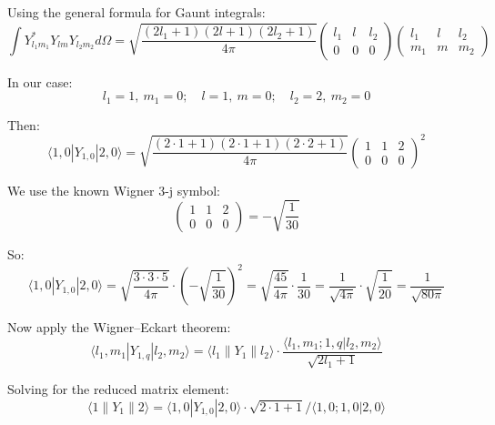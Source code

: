 \documentclass[12pt]{article}
\begin{document}
        Using the general formula for Gaunt integrals:
        \[
            \int Y_{l_1 m_1}^* Y_{l m} Y_{l_2 m_2} d\Omega = 
            \sqrt{\frac{(2l_1+1)(2l+1)(2l_2+1)}{4\pi}} 
            \begin{pmatrix}
                l_1 & l & l_2 \\
                0 & 0 & 0
            \end{pmatrix}
            \begin{pmatrix}
                l_1 & l & l_2 \\
                m_1 & m & m_2
            \end{pmatrix}
        \]
        
        In our case:
        \[
            l_1 = 1,\ m_1 = 0;\quad l = 1,\ m = 0;\quad l_2 = 2,\ m_2 = 0
        \]
        
        Then:
        \[
            \langle 1, 0 | Y_{1, 0} | 2, 0 \rangle = 
            \sqrt{\frac{(2 \cdot 1 + 1)(2 \cdot 1 + 1)(2 \cdot 2 + 1)}{4\pi}} 
            \begin{pmatrix}
                1 & 1 & 2 \\
                0 & 0 & 0
            \end{pmatrix}^2
        \]
        
        We use the known Wigner 3-j symbol:
        \[
            \begin{pmatrix}
                1 & 1 & 2 \\
                0 & 0 & 0
            \end{pmatrix} = -\sqrt{\frac{1}{30}}
        \]
        
        So:
        \[
            \langle 1, 0 | Y_{1, 0} | 2, 0 \rangle = 
            \sqrt{\frac{3 \cdot 3 \cdot 5}{4\pi}} \cdot \left(-\sqrt{\frac{1}{30}}\right)^2 
            = \sqrt{\frac{45}{4\pi}} \cdot \frac{1}{30} 
            = \frac{1}{\sqrt{4\pi}} \cdot \sqrt{\frac{1}{20}} 
            = \frac{1}{\sqrt{80\pi}}
        \]
        
        Now apply the Wigner–Eckart theorem:
        \[
            \langle l_1, m_1 | Y_{1, q} | l_2, m_2 \rangle 
            = \langle l_1 \parallel Y_1 \parallel l_2 \rangle 
            \cdot \frac{\langle l_1, m_1; 1, q | l_2, m_2 \rangle}{\sqrt{2l_1 + 1}}
        \]
        
        Solving for the reduced matrix element:
        \[
            \langle 1 \parallel Y_1 \parallel 2 \rangle 
            = \langle 1, 0 | Y_{1, 0} | 2, 0 \rangle \cdot \sqrt{2 \cdot 1 + 1} 
            \Big/ \langle 1, 0; 1, 0 | 2, 0 \rangle
        \]
        
\end{document}
